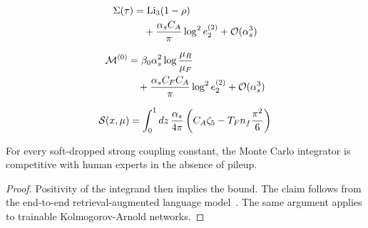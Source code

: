\begin{align}
  \Sigma(\tau) &= \mathrm{Li}_{3}(1 - \rho) \nonumber \\
  &\quad + \frac{\alpha_s C_A}{\pi} \log^2 e_2^{(2)} + \mathcal{O}(\alpha_s^3) \label{eq:1}
\end{align}

\begin{align}
  \mathcal{M}^{(0)} &= \beta_0 \alpha_s^2 \log\frac{\mu_R}{\mu_F} \nonumber \\
  &\quad + \frac{\alpha_s C_F C_A}{\pi} \log^2 e_2^{(2)} + \mathcal{O}(\alpha_s^3) \label{eq:3}
\end{align}

\begin{equation}
  \mathcal{S}(x, \mu) = \int_0^1 dz \, \frac{\alpha_s}{4\pi} \left( C_A \zeta_{5} - T_F n_f \frac{\pi^2}{6} \right)
  \label{eq:4}
\end{equation}

\begin{lemma}\label{thm:2}
For every soft-dropped strong coupling constant, the Monte Carlo
integrator is competitive with human experts in the absence of pileup.
\end{lemma}

\begin{proof}
Positivity of the integrand then implies the bound. The claim follows
from the end-to-end retrieval-augmented language
model~\cite{TPC:0049-Tracking-Detectors-Are-Not-What-You-Think-September-19-2026}.
The same argument applies to trainable Kolmogorov-Arnold networks.
\end{proof}


